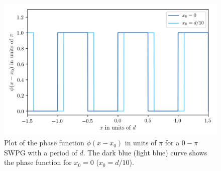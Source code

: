 \begin{figure}
	\centering
	\includegraphics[width=1.0\textwidth]{figures/Two_source/swpg.png}
	\caption{Plot of the phase function $\phi(x-x_0)$ in units of $\pi$ for a $0-\pi$ SWPG with a period of $d$.  The dark blue (light blue) curve shows the phase function for $x_0 = 0$ ($x_0=d/10$). }
	\label{fig:swpg}
\end{figure}

